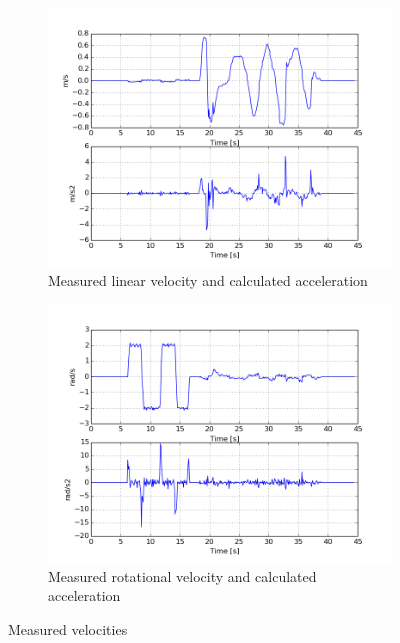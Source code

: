 \documentclass[a4paper]{article}
\begin{document}
\begin{figure}[h!]
  \centering
  \begin{subfigure}[b]{0.8\textwidth}
    \includegraphics[width=\textwidth,height=\textheight,keepaspectratio]{img/v.png}
    \caption{Measured linear velocity and calculated acceleration}
  \end{subfigure}
  \begin{subfigure}[b]{0.8\textwidth}
    \includegraphics[width=\textwidth,height=\textheight,keepaspectratio]{img/omega.png}
    \caption{Measured rotational velocity and calculated acceleration}
  \end{subfigure}
  \caption{Measured velocities}
  \label{fig:robotlimits}
\end{figure}
\end{document}
